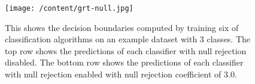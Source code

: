 \begin{figure}
	[h]	
	\texttt{[image: /content/grt-null.jpg]} \caption{This shows the decision boundaries computed by training six of classification algorithms on an example dataset with 3 classes. The top row shows the predictions of each classifier with null rejection disabled. The bottom row shows the predictions of each classifier with null rejection enabled with null rejection coefficient of 3.0. \cite{16} } \label{fg:grt:null} 
\end{figure}
